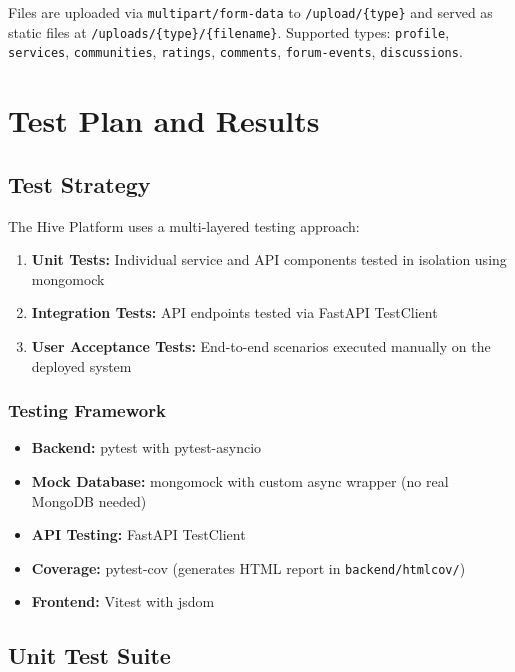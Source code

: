 \documentclass[10pt,a4paper]{report}
\begin{document}
Files are uploaded via \texttt{multipart/form-data} to \texttt{/upload/\{type\}} and served as static files at \texttt{/uploads/\{type\}/\{filename\}}. Supported types: \texttt{profile}, \texttt{services}, \texttt{communities}, \texttt{ratings}, \texttt{comments}, \texttt{forum-events}, \texttt{discussions}.

\chapter{Test Plan and Results}
\label{chap:tests}

\section{Test Strategy}

The Hive Platform uses a multi-layered testing approach:

\begin{enumerate}
    \item \textbf{Unit Tests:} Individual service and API components tested in isolation using mongomock
    \item \textbf{Integration Tests:} API endpoints tested via FastAPI TestClient
    \item \textbf{User Acceptance Tests:} End-to-end scenarios executed manually on the deployed system
\end{enumerate}

\subsection{Testing Framework}

\begin{itemize}
    \item \textbf{Backend:} pytest with pytest-asyncio
    \item \textbf{Mock Database:} mongomock with custom async wrapper (no real MongoDB needed)
    \item \textbf{API Testing:} FastAPI TestClient
    \item \textbf{Coverage:} pytest-cov (generates HTML report in \texttt{backend/htmlcov/})
    \item \textbf{Frontend:} Vitest with jsdom
\end{itemize}

\section{Unit Test Suite}
\end{document}
